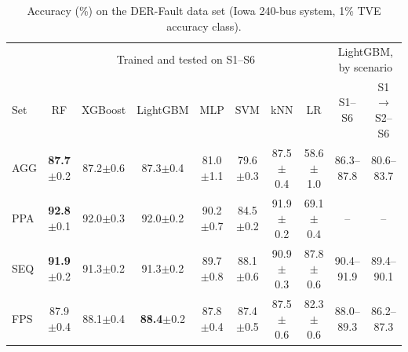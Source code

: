 \documentclass[11pt]{article}
\newenvironment{nwf}{}{}
\begin{document}
\begin{table}[!htbp]
\centering
\begin{nwf}
\caption{Accuracy (\%) on the DER-Fault data set (Iowa 240-bus system, 1\% TVE accuracy class).}\label{tab_der}
\footnotesize
\setlength{\tabcolsep}{2.6pt}
\begin{tabular}{lccccccccc}
\toprule
 & \multicolumn{7}{c}{Trained and tested on S1--S6} & \multicolumn{2}{c}{LightGBM, by scenario} \\
\cmidrule(lr){2-8}\cmidrule(lr){9-10}
Set & RF & XGBoost & LightGBM & MLP & SVM & kNN & LR & S1--S6 & S1 $\rightarrow$ S2--S6 \\
\midrule
AGG & \textbf{87.7}$\pm$0.2 & 87.2$\pm$0.6 & 87.3$\pm$0.4 & 81.0$\pm$1.1 & 79.6$\pm$0.3 & 87.5$\pm$0.4 & 58.6$\pm$1.0 & 86.3--87.8 & 80.6--83.7 \\
PPA & \textbf{92.8}$\pm$0.1 & 92.0$\pm$0.3 & 92.0$\pm$0.2 & 90.2$\pm$0.7 & 84.5$\pm$0.2 & 91.9$\pm$0.2 & 69.1$\pm$0.4 & -- & -- \\
SEQ & \textbf{91.9}$\pm$0.2 & 91.3$\pm$0.2 & 91.3$\pm$0.2 & 89.7$\pm$0.8 & 88.1$\pm$0.6 & 90.9$\pm$0.3 & 87.8$\pm$0.6 & 90.4--91.9 & 89.4--90.1 \\
FPS & 87.9$\pm$0.4 & 88.1$\pm$0.4 & \textbf{88.4}$\pm$0.2 & 87.8$\pm$0.4 & 87.4$\pm$0.5 & 87.5$\pm$0.6 & 82.3$\pm$0.6 & 88.0--89.3 & 86.2--87.3 \\
\bottomrule
\end{tabular}
\end{nwf}
\end{table}
\end{document}
